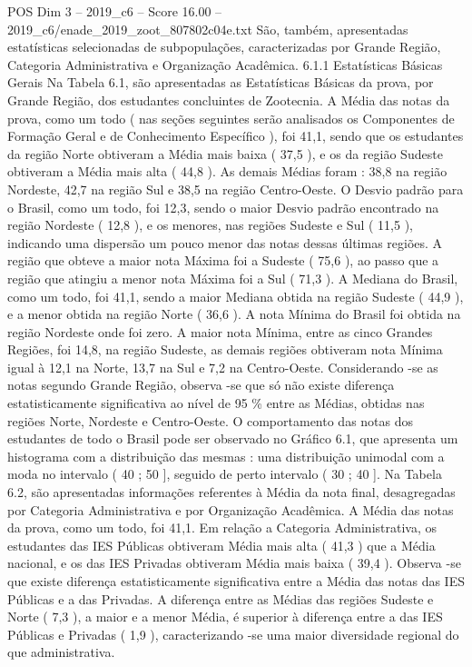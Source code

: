 \begin{textsample}{POS Dim 3 – 2019\_c6 – Score 16.00 – 2019\_c6/enade\_2019\_zoot\_807802c04e.txt}
São, também, apresentadas estatísticas selecionadas de subpopulações, caracterizadas por Grande Região, Categoria Administrativa e Organização Acadêmica. 6.1.1 Estatísticas Básicas Gerais Na Tabela 6.1, são apresentadas as Estatísticas Básicas da prova, por Grande Região, dos estudantes concluintes de Zootecnia.
A Média das notas da prova, como um todo ( nas seções seguintes serão analisados os Componentes de Formação Geral e de Conhecimento Específico ), foi 41,1, sendo que os estudantes da região Norte obtiveram a Média mais baixa ( 37,5 ), e os da região Sudeste obtiveram a Média mais alta ( 44,8 ).
As demais Médias foram : 38,8 na região Nordeste, 42,7 na região Sul e 38,5 na região Centro-Oeste.
O Desvio padrão para o Brasil, como um todo, foi 12,3, sendo o maior Desvio padrão encontrado na região Nordeste ( 12,8 ), e os menores, nas regiões Sudeste e Sul ( 11,5 ), indicando uma dispersão um pouco menor das notas dessas últimas regiões.
A região que obteve a maior nota Máxima foi a Sudeste ( 75,6 ), ao passo que a região que atingiu a menor nota Máxima foi a Sul ( 71,3 ).
A Mediana do Brasil, como um todo, foi 41,1, sendo a maior Mediana obtida na região Sudeste ( 44,9 ), e a menor obtida na região Norte ( 36,6 ).
A nota Mínima do Brasil foi obtida na região Nordeste onde foi zero.
A maior nota Mínima, entre as cinco Grandes Regiões, foi 14,8, na região Sudeste, as demais regiões obtiveram nota Mínima igual à 12,1 na Norte, 13,7 na Sul e 7,2 na Centro-Oeste.
Considerando -se as notas segundo Grande Região, observa -se que só não existe diferença estatisticamente significativa ao nível de 95 \% entre as Médias, obtidas nas regiões Norte, Nordeste e Centro-Oeste.
O comportamento das notas dos estudantes de todo o Brasil pode ser observado no Gráfico 6.1, que apresenta um histograma com a distribuição das mesmas : uma distribuição unimodal com a moda no intervalo ( 40 ; 50 ], seguido de perto intervalo ( 30 ; 40 ].
Na Tabela 6.2, são apresentadas informações referentes à Média da nota final, desagregadas por Categoria Administrativa e por Organização Acadêmica.
A Média das notas da prova, como um todo, foi 41,1.
Em relação a Categoria Administrativa, os estudantes das IES Públicas obtiveram Média mais alta ( 41,3 ) que a Média nacional, e os das IES Privadas obtiveram Média mais baixa ( 39,4 ).
Observa -se que existe diferença estatisticamente significativa entre a Média das notas das IES Públicas e a das Privadas.
A diferença entre as Médias das regiões Sudeste e Norte ( 7,3 ), a maior e a menor Média, é superior à diferença entre a das IES Públicas e Privadas ( 1,9 ), caracterizando -se uma maior diversidade regional do que administrativa.

\end{textsample}
